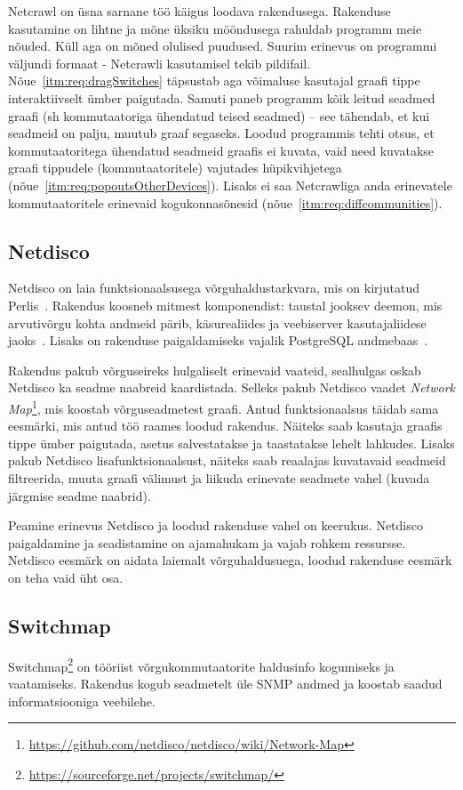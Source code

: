 \documentclass[12pt]{article}
\begin{document}
Netcrawl on üsna sarnane töö käigus loodava rakendusega.
Rakenduse kasutamine on lihtne ja mõne üksiku mööndusega rahuldab programm meie nõuded.
Küll aga on mõned olulised puudused.
Suurim erinevus on programmi väljundi formaat - Netcrawli kasutamisel tekib pildifail.
Nõue~\ref{itm:req:dragSwitches} täpsustab aga võimaluse kasutajal graafi tippe interaktiivselt
ümber paigutada.
Samuti paneb programm kõik leitud seadmed graafi (sh kommutaatoriga ühendatud teised seadmed) --
see tähendab, et kui seadmeid on palju, muutub graaf segaseks.
Loodud programmis tehti otsus, et kommutaatoritega ühendatud seadmeid graafis ei kuvata, vaid need
kuvatakse graafi tippudele (kommutaatoritele) vajutades
hüpikvihjetega (nõue~\ref{itm:req:popoutsOtherDevices}).
Lisaks ei saa Netcrawliga anda erinevatele kommutaatoritele erinevaid
kogukonnasõnesid (nõue~\ref{itm:req:diffcommunities}).

\subsection{Netdisco}
Netdisco on laia funktsionaalsusega võrguhaldustarkvara, mis on kirjutatud
Perlis~\cite{netdiscoDocs}.
Rakendus koosneb mitmest komponendist: taustal jooksev deemon, mis arvutivõrgu kohta andmeid pärib,
käsurealiides ja veebiserver kasutajaliidese jaoks~\cite{netdiscoDocs}.
Lisaks on rakenduse paigaldamiseks vajalik PostgreSQL andmebaas~\cite{netdiscoDocs}.

Rakendus pakub võrguseireks hulgaliselt erinevaid vaateid, sealhulgas oskab Netdisco ka seadme
naabreid kaardistada.
Selleks pakub Netdisco vaadet
\textit{Network Map}\footnote{\url{https://github.com/netdisco/netdisco/wiki/Network-Map}},
mis koostab võrguseadmetest graafi.
Antud funktsionaalsus täidab sama eesmärki, mis antud töö raames loodud rakendus.
Näiteks saab kasutaja graafis tippe ümber paigutada, asetus salvestatakse ja taastatakse lehelt
lahkudes.
Lisaks pakub Netdisco lisafunktsionaalsust, näiteks saab reaalajas kuvatavaid seadmeid filtreerida,
muuta graafi välimust ja liikuda erinevate seadmete vahel (kuvada järgmise seadme naabrid).

Peamine erinevus Netdisco ja loodud rakenduse vahel on keerukus.
Netdisco paigaldamine ja seadistamine on ajamahukam ja vajab rohkem ressursse.
Netdisco eesmärk on aidata laiemalt võrguhaldusuega, loodud rakenduse eesmärk on teha vaid üht osa.

\subsection{Switchmap}
Switchmap\footnote{\url{https://sourceforge.net/projects/switchmap/}} on tööriist
võrgukommutaatorite haldusinfo kogumiseks ja vaatamiseks.
Rakendus kogub seadmetelt üle SNMP andmed ja koostab saadud informatsiooniga veebilehe.
\end{document}
